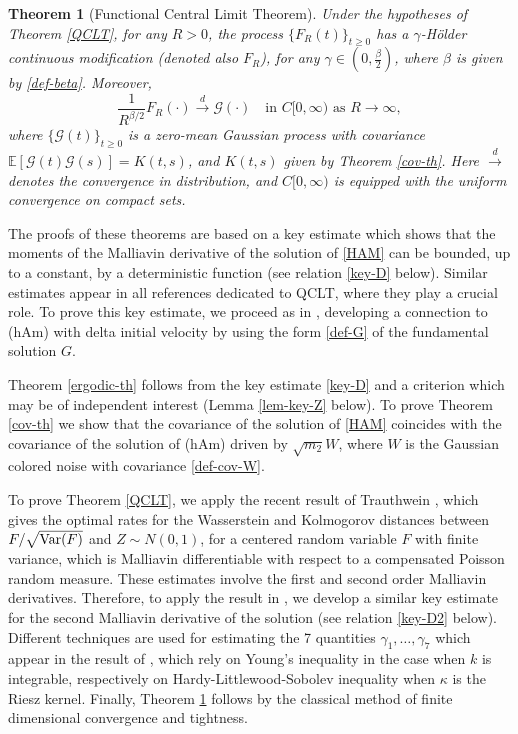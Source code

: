 \documentclass[12pt]{article}
\newtheorem{theorem}{Theorem}[section]
\def\cG{\mathcal{G}}
\def\bE{\mathbb{E}}
\def\k{\kappa}
\begin{document}
\begin{theorem}[Functional Central Limit Theorem]
\label{FCLT}
Under the hypotheses of Theorem \ref{QCLT}, for any $R>0$,
the process $\{F_R(t)\}_{t\geq 0}$ has a $\gamma$-H\"older continuous modification (denoted also $F_R$), for any $\gamma \in (0,\frac{\beta}{2})$, where $\beta$ is given by \eqref{def-beta}.
Moreover,
\[
\frac{1}{R^{\beta/2}}F_R(\cdot) \stackrel{d}{\to} \cG(\cdot) \quad \mbox{in $C[0,\infty)$ as $R \to \infty$},
\]
where $\{\cG(t)\}_{t\geq 0}$ is a zero-mean Gaussian process with covariance 
$\bE[\cG(t) \cG(s)]=K(t,s)$, and $K(t,s)$ given by Theorem \ref{cov-th}. Here $\stackrel{d}{\to}$ denotes the convergence in distribution, and $C[0,\infty)$ is equipped with the uniform convergence on compact sets.
\end{theorem}




The proofs of these theorems are based on a key estimate  which shows that the moments of the Malliavin derivative of the solution of \eqref{HAM} can be bounded, up to a constant, by a deterministic function (see relation \eqref{key-D} below). Similar estimates appear in all references dedicated to QCLT, where they play a crucial role. To prove this key estimate, we proceed as in \cite{BZ24}, developing a connection to (hAm) with delta initial velocity by using the form \eqref{def-G} of the fundamental solution $G$.

Theorem \ref{ergodic-th} follows from the key estimate \eqref{key-D} and a criterion which may be of independent interest (Lemma \ref{lem-key-Z} below). 
To prove Theorem \ref{cov-th} we show that the covariance of the solution of \eqref{HAM} coincides with the covariance of the solution of (hAm) driven by $\sqrt{m_2}W$, where $W$ is the Gaussian colored noise with covariance \eqref{def-cov-W}.


To prove Theorem \ref{QCLT}, we apply the recent result of Trauthwein \cite{trauthwein25}, which gives the optimal rates for the Wasserstein and Kolmogorov distances between $F/\sqrt{{\rm Var}(F)}$ and $Z \sim N(0,1)$, for a centered random variable $F$ with finite variance, which is Malliavin differentiable with respect to a compensated Poisson random measure. These estimates involve the first and second order Malliavin derivatives. Therefore, to  apply the result in \cite{trauthwein25}, we develop a similar key estimate for the second Malliavin derivative of the solution (see relation \eqref{key-D2} below). Different techniques are used for estimating the 7 quantities $\gamma_1,\ldots,\gamma_7$ which appear in the result of \cite{trauthwein25}, which rely on Young's inequality in the case when $k$ is integrable, respectively on Hardy-Littlewood-Sobolev inequality when $\k$ is the Riesz kernel. Finally, Theorem \ref{FCLT} follows by the classical method of finite dimensional convergence and tightness.
\end{document}
